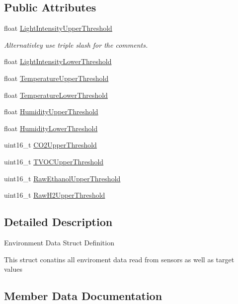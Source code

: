 \subsection*{Public Attributes}
\begin{DoxyCompactItemize}
\item 
float \hyperlink{structTargetEnvironmentData_a7755db8c43daca465d5ac3730d57f7d8}{Light\+Intensity\+Upper\+Threshold}
\begin{DoxyCompactList}\small\item\em Alternativley use triple slash for the comments. \end{DoxyCompactList}\item 
float \hyperlink{structTargetEnvironmentData_a4619dffef19d60fd03d690fd756b595c}{Light\+Intensity\+Lower\+Threshold}
\item 
float \hyperlink{structTargetEnvironmentData_a76d83792b14767a1bc23b57c027232d6}{Temperature\+Upper\+Threshold}
\item 
float \hyperlink{structTargetEnvironmentData_a908d87e4fd88c513d671c591d0710ce0}{Temperature\+Lower\+Threshold}
\item 
float \hyperlink{structTargetEnvironmentData_a8db2e041382994d52fe089f9953ff437}{Humidity\+Upper\+Threshold}
\item 
float \hyperlink{structTargetEnvironmentData_af40ad465a6e74c13caf26b3672b7470f}{Humidity\+Lower\+Threshold}
\item 
uint16\+\_\+t \hyperlink{structTargetEnvironmentData_ae54690e5e73396443f43d3bbd9851d3c}{C\+O2\+Upper\+Threshold}
\item 
uint16\+\_\+t \hyperlink{structTargetEnvironmentData_afdddfbd81d51a1831704d85b08e9df1a}{T\+V\+O\+C\+Upper\+Threshold}
\item 
uint16\+\_\+t \hyperlink{structTargetEnvironmentData_ab0bb15f753619e3013f49dda97d15eab}{Raw\+Ethanol\+Upper\+Threshold}
\item 
uint16\+\_\+t \hyperlink{structTargetEnvironmentData_a649b7d8751b329fba9494b5c730a55fd}{Raw\+H2\+Upper\+Threshold}
\end{DoxyCompactItemize}


\subsection{Detailed Description}
Environment Data Struct Definition

This struct conatins all enviroment data read from sensors as well as target values 

\subsection{Member Data Documentation}
\mbox{\label{structTargetEnvironmentData_ae54690e5e73396443f43d3bbd9851d3c}} 
